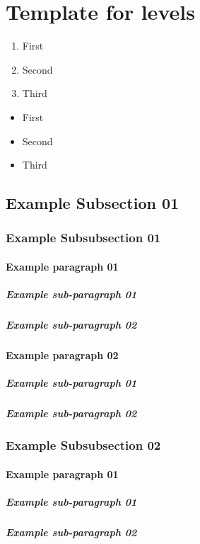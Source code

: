 \section{Template for levels}
	\begin{enumerate}
		\item{First}
		\item{Second}
		\item{Third}
	\end{enumerate}
	\begin{itemize}
		\item{First}
		\item{Second}
		\item{Third}
	\end{itemize}
	\subsection{Example Subsection 01}
		\subsubsection{Example Subsubsection 01}
			\paragraph{Example paragraph 01}
				\subparagraph{Example sub-paragraph 01}
				\subparagraph{Example sub-paragraph 02}
			\paragraph{Example paragraph 02}
				\subparagraph{Example sub-paragraph 01}
				\subparagraph{Example sub-paragraph 02}
		\subsubsection{Example Subsubsection 02}
			\paragraph{Example paragraph 01}
				\subparagraph{Example sub-paragraph 01}
				\subparagraph{Example sub-paragraph 02}
